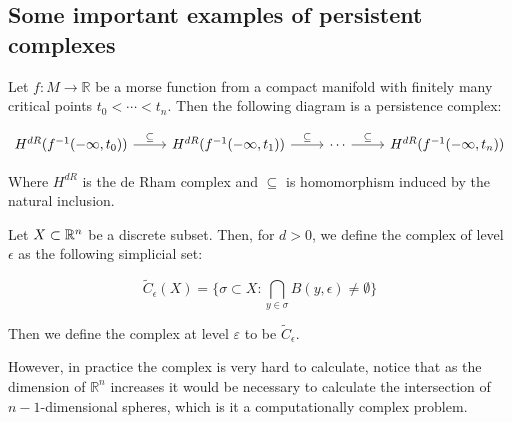 \subsection{Some important examples of persistent complexes}
\label{examplespersistence}

\begin{definition}
Let $f:M\to\mathbb{R}$ be a morse function from a compact manifold 
with finitely many critical points $t_0<\cdots<t_n$. Then the following diagram
is a persistence complex:

$$
\begin{tikzcd}
H^{dR}(f^{-1}(-\infty,t_0)) \arrow[r,"\subseteq"]
& H^{dR}(f^{-1}(-\infty,t_1)) \arrow[r,"\subseteq"]
& \cdots\arrow[r,"\subseteq"]
& H^{dR}(f^{-1}(-\infty,t_n))
\end{tikzcd}
$$

Where $H^{dR}$ is the de Rham complex and $\subseteq$
is homomorphism induced by the natural inclusion.

\end{definition}

\begin{definition}

Let $X\subset \mathbb{R}^n$ be a discrete subset. Then, for $d>0$, we define the {\Cech}
complex of level $\epsilon$ as the following simplicial set:


$$
\tilde{C}_\epsilon(X)
=
\{
\sigma \subset X :
\bigcap_{y\in\sigma} B(y,\epsilon)\neq \emptyset
\}
$$

Then we define the {\Cech} complex at level $\varepsilon$ to be $\tilde{C}_\epsilon$.

\end{definition}

%
%

However, in practice the {\Cech} complex is very hard to calculate,
notice that as the dimension of $\mathbb{R}^n$ increases it would be necessary
to calculate the intersection of $n-1$-dimensional spheres, which is it a
computationally complex problem.

